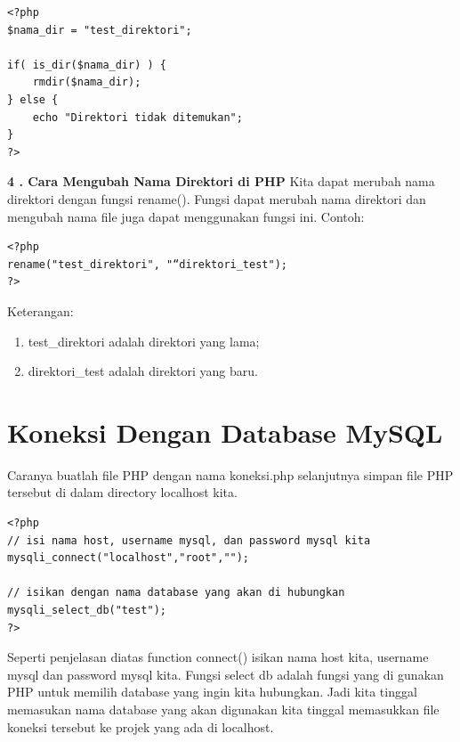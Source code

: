 \begin{lstlisting}
<?php
$nama_dir = "test_direktori";

if( is_dir($nama_dir) ) {
    rmdir($nama_dir); 
} else {
    echo "Direktori tidak ditemukan"; 
}
?>
\end{lstlisting}

\textbf{4 . Cara Mengubah Nama Direktori di PHP}
\newline
Kita dapat merubah nama direktori dengan fungsi rename(). Fungsi dapat merubah nama direktori dan mengubah nama file juga dapat menggunakan fungsi ini. Contoh:
\begin{lstlisting}
<?php 
rename("test_direktori", "“direktori_test"); 
?>
\end{lstlisting}

Keterangan:
\begin{enumerate}
\item test\_direktori adalah direktori yang lama;
\item direktori\_test adalah direktori yang baru.
\end{enumerate}

\section{Koneksi Dengan Database MySQL}
Caranya buatlah file PHP dengan nama koneksi.php selanjutnya simpan file PHP tersebut di dalam directory localhost kita.
\begin{lstlisting}
<?php 
// isi nama host, username mysql, dan password mysql kita
mysqli_connect("localhost","root","");
 
// isikan dengan nama database yang akan di hubungkan
mysqli_select_db("test");
?>
\end{lstlisting}
Seperti penjelasan diatas function connect() isikan nama host kita, username mysql dan password mysql kita. Fungsi select db adalah fungsi yang di gunakan PHP untuk memilih database yang ingin kita hubungkan. Jadi kita tinggal memasukan nama database yang akan digunakan kita tinggal memasukkan file koneksi tersebut ke projek yang ada di localhost. 

